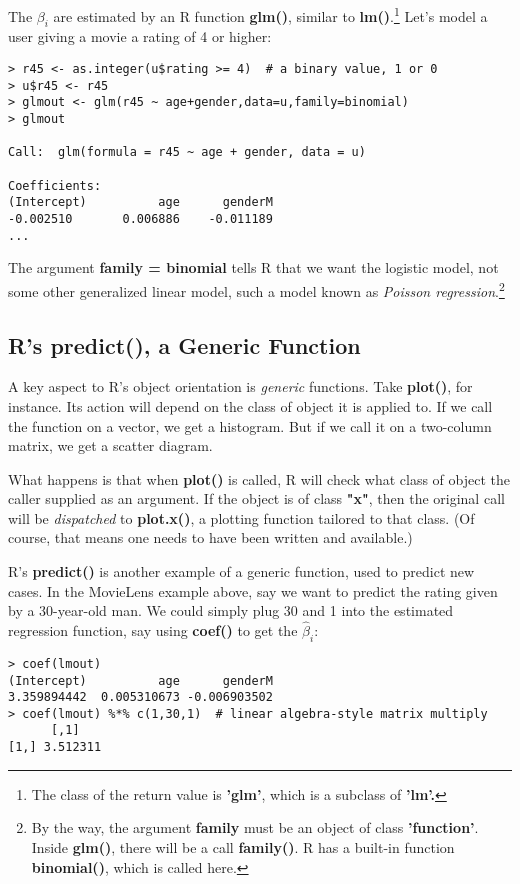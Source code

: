 The $\beta_i$ are estimated by an R function \textbf{glm()}, similar to
\textbf{lm()}.\footnote{The class of the return value is \textbf{'glm'},
which is a subclass of \textbf{'lm'.}
}
Let's model a user giving a movie a rating of 4 or
higher:

\begin{lstlisting}
> r45 <- as.integer(u$rating >= 4)  # a binary value, 1 or 0
> u$r45 <- r45
> glmout <- glm(r45 ~ age+gender,data=u,family=binomial)
> glmout

Call:  glm(formula = r45 ~ age + gender, data = u)

Coefficients:
(Intercept)          age      genderM  
-0.002510       0.006886    -0.011189  
...
\end{lstlisting}

The argument \textbf{family = binomial} tells R that we want the
logistic model, not some other generalized linear model, such a model
known as \textit{Poisson regression}.\footnote{By the way, the argument
\textbf{family} must be an object of class \textbf{'function'}.  Inside
\textbf{glm()}, there will be a call \textbf{family()}.  R has a
built-in function \textbf{binomial()}, which is called here.}

\subsection{R's predict(), a Generic Function}

A key aspect to R's object orientation is \textit{generic} functions.
Take \textbf{plot()}, for instance.  Its action will depend on the class
of object it is applied to.  If we call the function on a vector, we get
a histogram.  But if we call it on a two-column matrix, we get a scatter
diagram.

What happens is that when \textbf{plot()} is called, R will check what
class of object the caller supplied as an argument.  If the object is of
class \textbf{"x"}, then the original call will be \textit{dispatched}
to \textbf{plot.x()}, a plotting function tailored to that class.  (Of
course, that means one needs to have been written and available.)

R's \textbf{predict()} is another example of a generic function, used to
predict new cases.  In the MovieLens example above, say we want to
predict the rating given by a 30-year-old man.  We could simply plug
30 and 1 into the estimated regression function, say using
\textbf{coef()} to get the $\widehat{\beta}_i$:

\begin{lstlisting}
> coef(lmout)
(Intercept)          age      genderM 
3.359894442  0.005310673 -0.006903502 
> coef(lmout) %*% c(1,30,1)  # linear algebra-style matrix multiply
      [,1]
[1,] 3.512311
\end{lstlisting}

